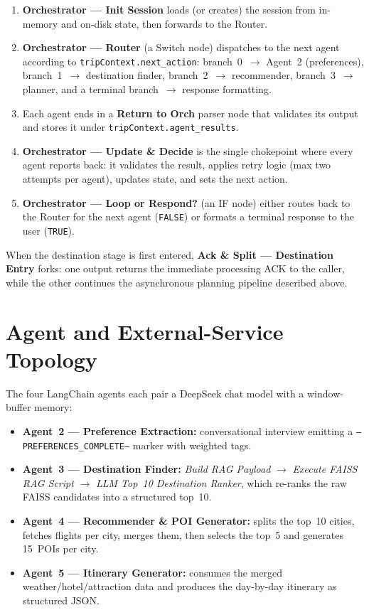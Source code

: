 \documentclass[12pt,a4paper]{report}
\begin{document}
\begin{appendices}
\begin{enumerate}
    \item \textbf{Orchestrator --- Init Session} loads (or creates) the session from in-memory and
          on-disk state, then forwards to the Router.
    \item \textbf{Orchestrator --- Router} (a Switch node) dispatches to the next agent according to
          \texttt{tripContext.next\_action}: branch~0~$\rightarrow$ Agent~2 (preferences),
          branch~1~$\rightarrow$ destination finder, branch~2~$\rightarrow$ recommender,
          branch~3~$\rightarrow$ planner, and a terminal branch~$\rightarrow$ response formatting.
    \item Each agent ends in a \textbf{Return to Orch} parser node that validates its output and
          stores it under \texttt{tripContext.agent\_results}.
    \item \textbf{Orchestrator --- Update \& Decide} is the single chokepoint where every agent
          reports back: it validates the result, applies retry logic (max two attempts per agent),
          updates state, and sets the next action.
    \item \textbf{Orchestrator --- Loop or Respond?} (an IF node) either routes back to the Router
          for the next agent (\texttt{FALSE}) or formats a terminal response to the user
          (\texttt{TRUE}).
\end{enumerate}

When the destination stage is first entered, \textbf{Ack \& Split --- Destination Entry} forks: one
output returns the immediate processing ACK to the caller, while the other continues the asynchronous
planning pipeline described above.

\section{Agent and External-Service Topology}

The four LangChain agents each pair a DeepSeek chat model with a window-buffer memory:

\begin{itemize}
    \item \textbf{Agent~2 --- Preference Extraction:} conversational interview emitting a
          \texttt{---PREFERENCES\_COMPLETE---} marker with weighted tags.
    \item \textbf{Agent~3 --- Destination Finder:} \emph{Build RAG Payload} $\rightarrow$
          \emph{Execute FAISS RAG Script} $\rightarrow$ \emph{LLM Top~10 Destination Ranker}, which
          re-ranks the raw FAISS candidates into a structured top~10.
    \item \textbf{Agent~4 --- Recommender \& POI Generator:} splits the top~10 cities, fetches
          flights per city, merges them, then selects the top~5 and generates 15~POIs per city.
    \item \textbf{Agent~5 --- Itinerary Generator:} consumes the merged weather/hotel/attraction
          data and produces the day-by-day itinerary as structured JSON.
\end{itemize}


\end{appendices}
\end{document}
